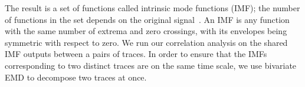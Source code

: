 The result is a set of functions called intrinsic mode functions (IMF); the number of functions in 
the set depends on the original signal~\cite{emd_process}.  An IMF is any 
function with the same number of extrema and zero crossings, with its envelopes being symmetric with respect to zero.
We run our correlation analysis on the shared IMF outputs between a pairs of traces.  In order to ensure 
that the IMFs corresponding to two distinct traces are on the same time scale, we use 
bivariate EMD \cite{rilling:biemd2007} to decompose two traces at once. 
